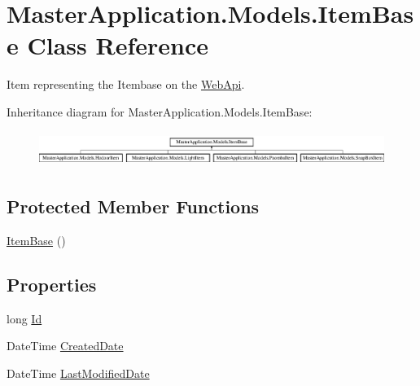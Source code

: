 \hypertarget{class_master_application_1_1_models_1_1_item_base}{}\section{Master\+Application.\+Models.\+Item\+Base Class Reference}
\label{class_master_application_1_1_models_1_1_item_base}


Item representing the Itembase on the \mbox{\hyperlink{namespace_web_api}{Web\+Api}}.  


Inheritance diagram for Master\+Application.\+Models.\+Item\+Base\+:\begin{figure}[H]
\begin{center}
\leavevmode
\includegraphics[height=1.152263cm]{class_master_application_1_1_models_1_1_item_base}
\end{center}
\end{figure}
\subsection*{Protected Member Functions}
\begin{DoxyCompactItemize}
\item 
\mbox{\hyperlink{class_master_application_1_1_models_1_1_item_base_ad3e45922707a219a65cf9d6484236166}{Item\+Base}} ()
\end{DoxyCompactItemize}
\subsection*{Properties}
\begin{DoxyCompactItemize}
\item 
long \mbox{\hyperlink{class_master_application_1_1_models_1_1_item_base_a05db6c74de6848c7ee8b563d8d9764cc}{Id}}
\item 
Date\+Time \mbox{\hyperlink{class_master_application_1_1_models_1_1_item_base_a938525c8db5562338ea52d9f379ff4c6}{Created\+Date}}
\item 
Date\+Time \mbox{\hyperlink{class_master_application_1_1_models_1_1_item_base_a468781bbd7d128446bf85096fc61b6d0}{Last\+Modified\+Date}}
\end{DoxyCompactItemize}


